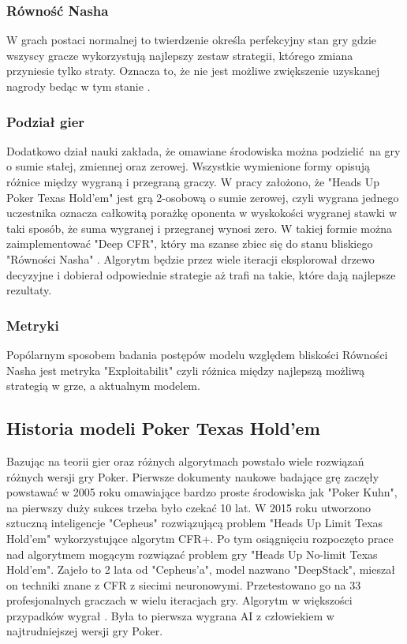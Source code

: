 \documentclass[12pt,oneside,a4paper]{report}
\begin{document}
\subsubsection{Równość Nasha}

W grach postaci normalnej \cite{n} to twierdzenie określa perfekcyjny stan gry gdzie wszyscy gracze wykorzystują najlepszy
zestaw strategii, którego zmiana przyniesie tylko straty. Oznacza to, że nie jest możliwe
zwiększenie uzyskanej nagrody bedąc w tym stanie \cite{gt}.

\subsubsection{Podział gier}

Dodatkowo dział nauki zakłada, że omawiane środowiska można podzielić na gry o sumie stałej, 
zmiennej oraz zerowej. Wszystkie wymienione formy opisują różnice między wygraną i przegraną 
graczy. W pracy założono, że "Heads Up Poker Texas Hold'em" jest grą
2-osobową o sumie zerowej, czyli wygrana jednego
uczestnika oznacza całkowitą porażkę oponenta w wyskokości wygranej stawki w taki sposób, że suma 
wygranej i przegranej wynosi zero. W takiej formie można
zaimplementować "Deep CFR", który ma szanse zbiec się do stanu bliskiego "Równości Nasha" \cite{dcfr}.
Algorytm będzie przez wiele iteracji eksplorował drzewo decyzyjne i dobierał odpowiednie 
strategie aż trafi na takie, które dają najlepsze rezultaty.

\subsubsection{Metryki}

Popólarnym sposobem badania postępów modelu względem bliskości Równości Nasha jest metryka "Exploitabilit"
czyli różnica między najlepszą możliwą strategią w grze, a aktualnym modelem.

\subsection{Historia modeli Poker Texas Hold'em}

Bazując na teorii gier oraz różnych algorytmach powstało wiele rozwiązań różnych wersji gry Poker.
Pierwsze dokumenty naukowe badające grę zaczęły powstawać w 2005 roku omawiające bardzo proste
środowiska jak "Poker Kuhn", na pierwszy duży sukces trzeba było czekać 10 lat.
W 2015 roku utworzono sztuczną inteligencje "Cepheus" rozwiązującą problem
"Heads Up Limit Texas Hold'em" wykorzystujące algorytm CFR+. Po tym osiągnięciu rozpoczęto prace nad
algorytmem mogącym rozwiązać problem gry "Heads Up No-limit Texas Hold'em". Zajeło to 2 lata od 
"Cepheus'a", model nazwano "DeepStack", mieszał on techniki znane z CFR z siecimi neuronowymi. 
Przetestowano go na 33 profesjonalnych graczach w wielu iteracjach gry. Algorytm w większości
przypadków wygrał \cite{ds}. Była to pierwsza wygrana AI z człowiekiem w najtrudniejszej wersji gry Poker.
\end{document}
